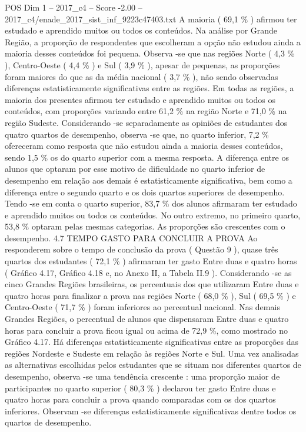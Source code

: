 \begin{textsample}{POS Dim 1 – 2017\_c4 – Score -2.00 – 2017\_c4/enade\_2017\_sist\_inf\_9223c47403.txt}
A maioria ( 69,1 \% ) afirmou ter estudado e aprendido muitos ou todos os conteúdos.
Na análise por Grande Região, a proporção de respondentes que escolheram a opção não estudou ainda a maioria desses conteúdos foi pequena.
Observa -se que nas regiões Norte ( 4,3 \% ), Centro-Oeste ( 4,4 \% ) e Sul ( 3,9 \% ), apesar de pequenas, as proporções foram maiores do que as da média nacional ( 3,7 \% ), não sendo observadas diferenças estatisticamente significativas entre as regiões.
Em todas as regiões, a maioria dos presentes afirmou ter estudado e aprendido muitos ou todos os conteúdos, com proporções variando entre 61,2 \% na região Norte e 71,0 \% na região Sudeste.
Considerando -se separadamente as opiniões de estudantes dos quatro quartos de desempenho, observa -se que, no quarto inferior, 7,2 \% ofereceram como resposta que não estudou ainda a maioria desses conteúdos, sendo 1,5 \% os do quarto superior com a mesma resposta.
A diferença entre os alunos que optaram por esse motivo de dificuldade no quarto inferior de desempenho em relação aos demais é estatisticamente significativa, bem como a diferença entre o segundo quarto e os dois quartos superiores de desempenho.
Tendo -se em conta o quarto superior, 83,7 \% dos alunos afirmaram ter estudado e aprendido muitos ou todos os conteúdos.
No outro extremo, no primeiro quarto, 53,8 \% optaram pelas mesmas categorias.
As proporções são crescentes com o desempenho. 4.7 TEMPO GASTO PARA CONCLUIR A PROVA Ao responderem sobre o tempo de conclusão da prova ( Questão 9 ), quase três quartos dos estudantes ( 72,1 \% ) afirmaram ter gasto Entre duas e quatro horas ( Gráfico 4.17, Gráfico 4.18 e, no Anexo II, a Tabela II.9 ).
Considerando -se as cinco Grandes Regiões brasileiras, os percentuais dos que utilizaram Entre duas e quatro horas para finalizar a prova nas regiões Norte ( 68,0 \% ), Sul ( 69,5 \% ) e Centro-Oeste ( 71,7 \% ) foram inferiores ao percentual nacional.
Nas demais Grandes Regiões, o percentual de alunos que dispensaram Entre duas e quatro horas para concluir a prova ficou igual ou acima de 72,9 \%, como mostrado no Gráfico 4.17.
Há diferenças estatisticamente significativas entre as proporções das regiões Nordeste e Sudeste em relação às regiões Norte e Sul.
Uma vez analisadas as alternativas escolhidas pelos estudantes que se situam nos diferentes quartos de desempenho, observa -se uma tendência crescente : uma proporção maior de participantes no quarto superior ( 80,3 \% ) declarou ter gasto Entre duas e quatro horas para concluir a prova quando comparadas com os dos quartos inferiores.
Observam -se diferenças estatisticamente significativas dentre todos os quartos de desempenho.

\end{textsample}
